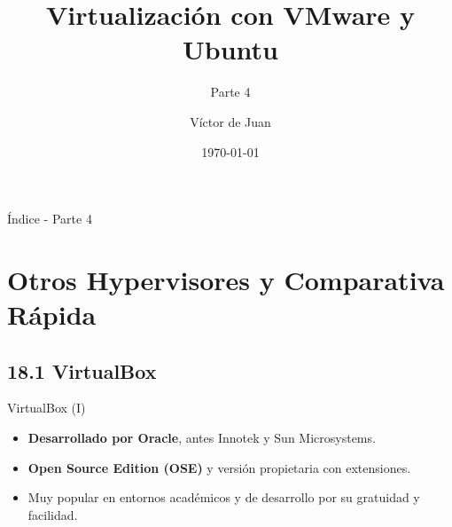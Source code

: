 \documentclass{beamer}
\title{Virtualización con VMware y Ubuntu}
\subtitle{Parte 4}
\author{Víctor de Juan}
\date{\today}
\begin{document}
\begin{frame}
	\titlepage
\end{frame}

\begin{frame}{Índice - Parte 4}
	\tableofcontents[hideallsubsections]
\end{frame}

\section{Otros Hypervisores y Comparativa Rápida}

\subsection{18.1 VirtualBox}
\begin{frame}{VirtualBox (I)}
	\begin{itemize}
		\item \textbf{Desarrollado por Oracle}, antes Innotek y Sun Microsystems.
		\item \textbf{Open Source Edition (OSE)} y versión propietaria con extensiones.
		\item Muy popular en entornos académicos y de desarrollo por su gratuidad y facilidad.
	\end{itemize}
\end{frame}
\end{document}
